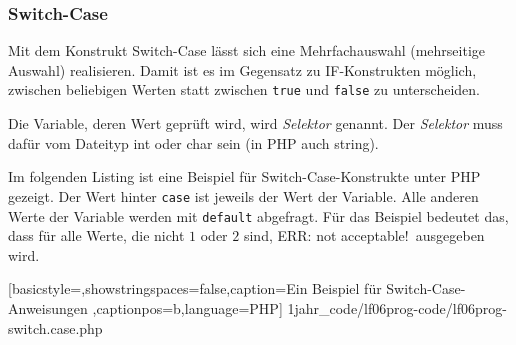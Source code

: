 \subsubsection{Switch-Case}

Mit dem Konstrukt Switch-Case lässt sich eine Mehrfachauswahl (mehrseitige Auswahl) realisieren. Damit ist es im Gegensatz zu IF-Konstrukten möglich, zwischen beliebigen Werten statt zwischen \texttt{true} und \texttt{false} zu unterscheiden.

Die Variable, deren Wert geprüft wird, wird {\it Selektor} genannt. Der {\it Selektor} muss dafür vom Dateityp int oder char sein (in PHP auch string).

Im folgenden Listing ist eine Beispiel für Switch-Case-Konstrukte unter PHP gezeigt. Der Wert hinter \texttt{case} ist jeweils der Wert der Variable. Alle anderen Werte der Variable werden mit \texttt{default} abgefragt. Für das Beispiel bedeutet das, dass für alle Werte, die nicht $1$ oder $2$ sind, \ql ERR: not acceptable!\qr\ ausgegeben wird.


	[basicstyle=\small,showstringspaces=false,caption={Ein Beispiel für Switch-Case-Anweisungen}
	\label{lst:Switch-Case},captionpos=b,language=PHP]
	{1jahr_code/lf06prog-code/lf06prog-switch.case.php}
	
